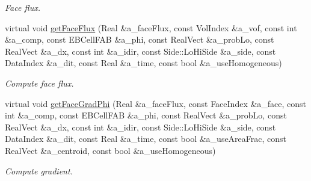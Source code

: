 \begin{DoxyCompactItemize}
\begin{DoxyCompactList}\small\item\em Face flux. \end{DoxyCompactList}\item 
virtual void \hyperlink{classrobinconductivitydomainbc_aea60c0953968756dc1b7d5625e921d40}{get\+Face\+Flux} (Real \&a\+\_\+face\+Flux, const Vol\+Index \&a\+\_\+vof, const int \&a\+\_\+comp, const E\+B\+Cell\+F\+AB \&a\+\_\+phi, const Real\+Vect \&a\+\_\+prob\+Lo, const Real\+Vect \&a\+\_\+dx, const int \&a\+\_\+idir, const Side\+::\+Lo\+Hi\+Side \&a\+\_\+side, const Data\+Index \&a\+\_\+dit, const Real \&a\+\_\+time, const bool \&a\+\_\+use\+Homogeneous)
\begin{DoxyCompactList}\small\item\em Compute face flux. \end{DoxyCompactList}\item 
virtual void \hyperlink{classrobinconductivitydomainbc_a9406f99be739ba5982b86811babe15ec}{get\+Face\+Grad\+Phi} (Real \&a\+\_\+face\+Flux, const Face\+Index \&a\+\_\+face, const int \&a\+\_\+comp, const E\+B\+Cell\+F\+AB \&a\+\_\+phi, const Real\+Vect \&a\+\_\+prob\+Lo, const Real\+Vect \&a\+\_\+dx, const int \&a\+\_\+idir, const Side\+::\+Lo\+Hi\+Side \&a\+\_\+side, const Data\+Index \&a\+\_\+dit, const Real \&a\+\_\+time, const bool \&a\+\_\+use\+Area\+Frac, const Real\+Vect \&a\+\_\+centroid, const bool \&a\+\_\+use\+Homogeneous)
\begin{DoxyCompactList}\small\item\em Compute gradient. \end{DoxyCompactList}\end{DoxyCompactItemize}
